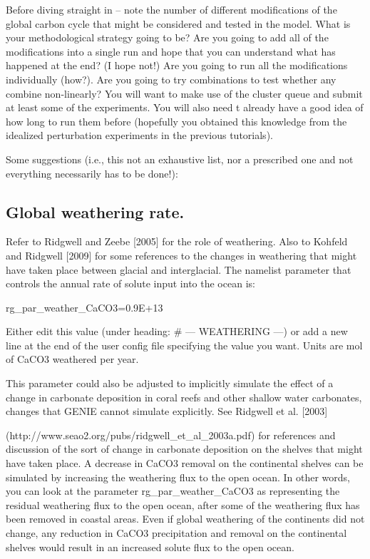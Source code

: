 \documentclass[11pt,fleqn]{book} %
\begin{document}
Before diving straight in -- note the number of different modifications of the global carbon cycle that
might be considered and tested in the model. What is your methodological strategy going to be?
Are you going to add all of the modifications into a single run and hope that you can understand
what has happened at the end? (I hope not!) Are you going to run all the modifications individually
(how?). Are you going to try combinations to test whether any combine non-linearly? You will want
to make use of the cluster queue and submit at least some of the experiments. You will also need t
already have a good idea of how long to run them before (hopefully you obtained this knowledge
from the idealized perturbation experiments in the previous tutorials).

Some suggestions (i.e., this not an exhaustive list, nor a prescribed one and not everything
necessarily has to be done!):

%
\subsection{Global weathering rate.}

Refer to Ridgwell and Zeebe [2005] for the role of weathering.
Also to Kohfeld and Ridgwell [2009] for some references to the changes in weathering that
might have taken place between glacial and interglacial. The namelist parameter that
controls the annual rate of solute input into the ocean is:

rg\_par\_weather\_CaCO3=0.9E+13

Either edit this value (under heading: \# --- WEATHERING ---) or add a new line at the
end of the user config file specifying the value you want. Units are mol of CaCO3 weathered
per year.

This parameter could also be adjusted to implicitly simulate the effect of a change in
carbonate deposition in coral reefs and other shallow water carbonates, changes that
GENIE cannot simulate explicitly. See Ridgwell et al. [2003]

(http://www.seao2.org/pubs/ridgwell\_et\_al\_2003a.pdf) for references and discussion of the
sort of change in carbonate deposition on the shelves that might have taken place. A
decrease in CaCO3 removal on the continental shelves can be simulated by increasing the
weathering flux to the open ocean. In other words, you can look at the parameter
rg\_par\_weather\_CaCO3 as representing the residual weathering flux to the open ocean,
after some of the weathering flux has been removed in coastal areas. Even if global
weathering of the continents did not change, any reduction in CaCO3 precipitation and
removal on the continental shelves would result in an increased solute flux to the open
ocean.
\end{document}
